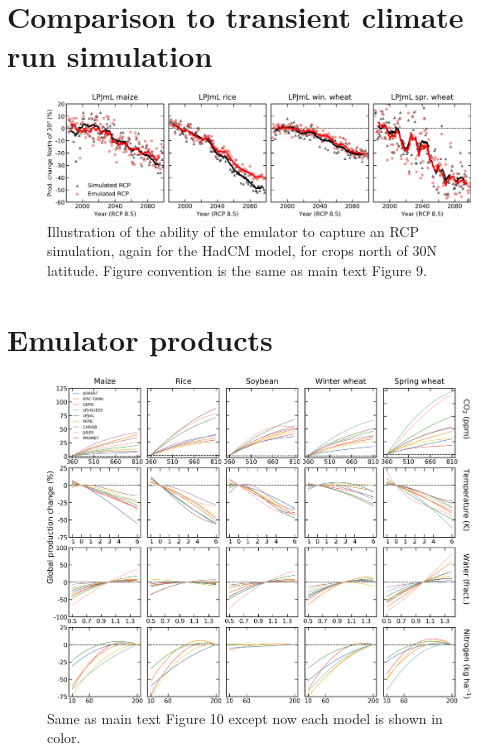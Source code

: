 \documentclass[10pt]{article}
\begin{document}
{{\section{Comparison to transient climate run simulation}
\begin{figure}[h!]
  \centering
  \includegraphics[width = 16.3cm]{LPJMLRCP85comp_30N.png}
  \caption{
  Illustration of the ability of the emulator to capture an RCP simulation, again for the HadCM model, for crops north of 30N latitude. Figure convention is the same as main text Figure 9.
  }
  \label{fig:lpjmlrcp}
\end{figure}



\clearpage
\section{Emulator products}
\begin{figure}[h!]
  \centering
  \includegraphics[width = 16.3cm]{em_CTWN_all_crops_color.png}
  \caption{
  Same as main text Figure 10 except now each model is shown in color.
  }
  \label{fig:all_dims}
\end{figure}

}}
\end{document}

